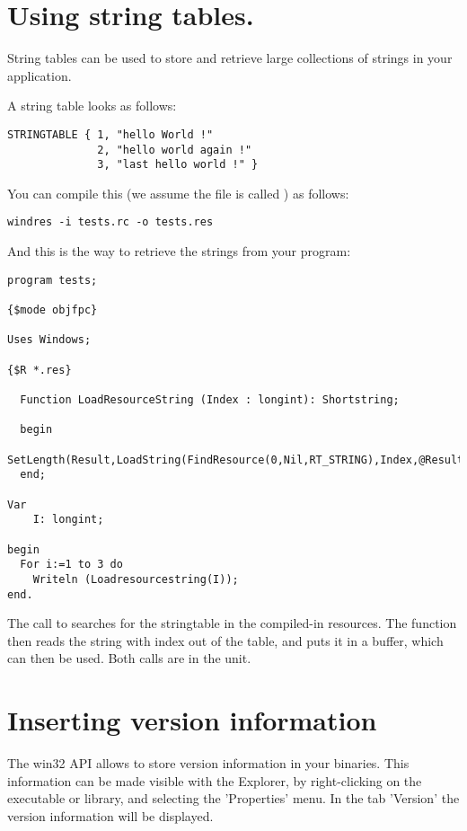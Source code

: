 {\section{Using string tables.}
String tables can be used to store and retrieve large collections of
strings in your application.

A string table looks as follows:
\begin{verbatim}
STRINGTABLE { 1, "hello World !"
              2, "hello world again !"
              3, "last hello world !" }
\end{verbatim}
You can compile this (we assume the file is called ) as
follows:
\begin{verbatim}
windres -i tests.rc -o tests.res
\end{verbatim}
And this is the way to retrieve the strings from your program:
\begin{verbatim}
program tests;

{$mode objfpc}

Uses Windows;

{$R *.res}

  Function LoadResourceString (Index : longint): Shortstring;

  begin
    SetLength(Result,LoadString(FindResource(0,Nil,RT_STRING),Index,@Result[1],SizeOf(Result)))
  end;

Var
    I: longint;

begin
  For i:=1 to 3 do
    Writeln (Loadresourcestring(I));
end.
\end{verbatim}
The call to  searches for the stringtable in the
compiled-in resources. The  function then reads the
string with index  out of the table, and puts it in a buffer,
which can then be used. Both calls are in the  unit.

\section{Inserting version information}

The win32 API allows to store version information in your binaries.
This information can be made visible with the \windows Explorer, by
right-clicking on the executable or library, and selecting the
'Properties' menu. In the tab 'Version' the version information will
be displayed.

}
